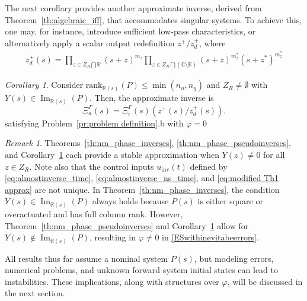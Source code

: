 \documentclass[journal]{IEEEtran}
\theoremstyle{remark}
\newtheorem{remark}{Remark}
\newtheorem{corollary}{Corollary}
\DeclareMathOperator*{\im}{Im}
\begin{document}
The next corollary provides another approximate inverse, derived from Theorem~\ref{th:algebraic_iff}, that accommodates singular systems. To achieve this, one may, for instance, introduce sufficient low-pass characteristics, or alternatively apply a scalar output redefinition $z^+/z_d^+$, where 
\begin{align*} 
    z^+_d(s)=\prod_{z \in Z_R\bigcap \mathbb{R}} (s + z)^{m_z} \prod_{z \in Z_R\bigcap (\mathbb{C}\setminus \mathbb{R})} (s + z)^{m_z^\ast} (s + {z}^\ast)^{m_z^\ast}
\end{align*}
\begin{corollary} \label{coro:modified Th1}
Consider \(\text{rank}_{\mathbb{R}(s)}(P) \le \min (n_u,n_y) \) and \( Z_R \neq \emptyset \) with $Y(s) \in \im_{\mathbb{R}(s)}(P)$. Then, the approximate inverse is 
\begin{equation} \label{eq:modified Th1 approx}
  \Xi_a^\Gamma(s) = \Xi_i^\Gamma(s)({z^+(s)}/{z_d^+(s)}).
\end{equation}
satisfying Problem~\ref{pr:problem definition}.b with $\varphi=0$
\end{corollary}
\begin{remark}
Theorems~\ref{th:nm_phase_inverses}, \ref{th:nm_phase_pseudoinverses}, and Corollary~\ref{coro:modified Th1} each provide a stable approximation when $Y(z) \neq 0$ for all $z \in Z_R$. Note also that the control inputs $u_{\text{inv}}(t)$ defined by \eqref{eq:almostinverse_time}, \eqref{eq:almostinverse_ns_time}, and \eqref{eq:modified Th1 approx} are not unique.
In Theorem~\ref{th:nm_phase_inverses}, the condition $Y(s) \in \im_{\mathbb{R}(s)}(P)$ always holds because $P(s)$ is either square or overactuated and has full column rank. However, Theorem~\ref{th:nm_phase_pseudoinverses} and Corollary~\ref{coro:modified Th1} allow for $Y(s)\notin \im_{\mathbb{R}(s)}(P)$, resulting in $\varphi \neq 0$ in \eqref{ESwithinevitabeerrors}.
\end{remark}
All results thus far assume a nominal system \( P(s) \), but modeling errors, numerical problems, and unknown forward system initial states can lead to instabilities. These implications, along with structures over \( \varphi \), will be discussed in the next section. 
\end{document}
